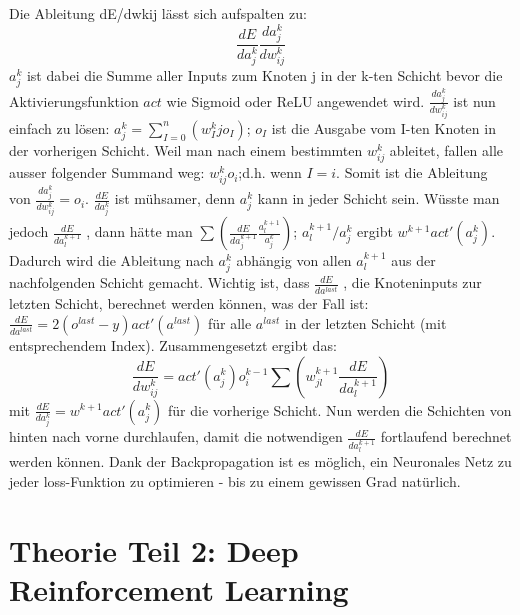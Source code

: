 \documentclass[12pt,a4paper]{article}
\begin{document}
Die Ableitung dE/dwkij lässt sich aufspalten zu: 
		$$\frac{dE}{da^k_j} \frac{da^k_j}{dw^k_{ij}}$$
$a^k_j$  ist dabei die Summe aller Inputs zum Knoten j in der k-ten Schicht bevor die Aktivierungsfunktion $act$ wie Sigmoid oder ReLU angewendet wird. 
$\frac{da^k_j}{dw^k_{ij}}$ ist nun einfach zu lösen: $a^k_j = \sum_{I=0}^{n}(w^k_Ij o_I)$; $o_I$ ist die Ausgabe vom I-ten Knoten in der vorherigen Schicht. Weil man nach einem bestimmten $w^k_{ij}$ ableitet, fallen alle ausser folgender Summand weg: $w^k_{ij} o_i $;d.h. wenn $I = i$. Somit ist die Ableitung von $\frac{da^k_j}{dw^k_{ij}} = o_i$.
$\frac{dE}{da^k_j}$ ist mühsamer, denn $a^k_j$ kann in jeder Schicht sein. Wüsste man jedoch $\frac{dE}{da^{k+1}_l}$ , dann hätte man $\sum(\frac{dE}{da^{k+1}_j}\frac{ a^{k+1}_l}{a^k_j})$; $a^{k+1}_l/a^k_j$ ergibt $w^{k+1}act'(a^k_j)$.
Dadurch wird die Ableitung nach $a^k_j$ abhängig von allen $a^{k+1}_l$ aus der nachfolgenden Schicht gemacht. Wichtig ist, dass $\frac{dE}{da^{last}}$ , die Knoteninputs zur letzten Schicht, berechnet werden können, was der Fall ist: 
		$\frac{dE}{da^{last}} = 2(o^{last}-y) act'(a^{last})$ für alle $a^{last}$ in der letzten Schicht (mit entsprechendem Index). 
Zusammengesetzt ergibt das: 
	$$\frac{dE}{dw^k_{ij}} = act'(a^k_j) o^{k-1}_i \sum( w^{k+1}_{jl}  \frac{dE}{da^{k+1}_l} )$$
mit  $\frac{dE}{da^k_j} =  w^{k+1} act'(a^k_j)$ für die vorherige Schicht.
Nun werden die Schichten von hinten nach vorne durchlaufen, damit die notwendigen $\frac{dE}{da^{k+1}_l}$  fortlaufend berechnet werden können.
Dank der Backpropagation ist es möglich, ein Neuronales Netz zu jeder loss-Funktion zu optimieren - bis zu einem gewissen Grad natürlich.
\newpage

\section{Theorie Teil 2: Deep Reinforcement Learning}
\end{document}
